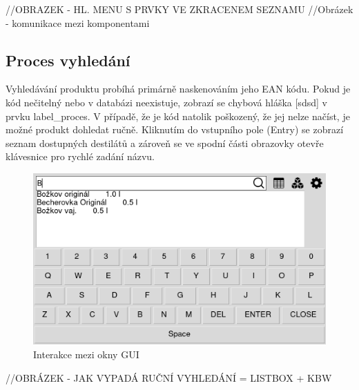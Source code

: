 //OBRAZEK - HL. MENU S PRVKY VE ZKRACENEM SEZNAMU
//Obrázek - komunikace mezi komponentami

\subsection{Proces vyhledání}




Vyhledávání produktu probíhá primárně naskenováním jeho EAN kódu. Pokud je kód nečitelný nebo v databázi neexistuje, zobrazí se chybová hláška [sdsd] v prvku label\_proces. V případě, že je kód natolik poškozený, že jej nelze načíst, je možné produkt dohledat ručně. Kliknutím do vstupního pole (Entry) se zobrazí seznam dostupných destilátů a zároveň se ve spodní části obrazovky otevře klávesnice pro rychlé zadání názvu.

\begin{figure}[H]
    \begin{center}
        \includegraphics[scale=0.4]{obrazky/GUI Klavesnice + list_box + filr.png}
    \end{center}
    \caption{Interakce mezi okny GUI}
    \label{Interakce mezi okny GUI}
\end{figure}
//OBRÁZEK - JAK VYPADÁ RUČNÍ VYHLEDÁNÍ = LISTBOX + KBW

